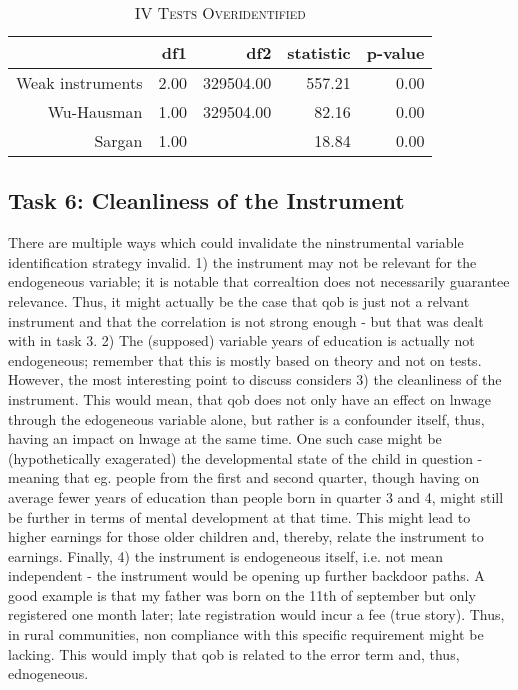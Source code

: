 \documentclass[a4paper]{article}
\begin{document}
\begin{table}[ht]
\captionsetup{font=small, justification=centering,singlelinecheck=false}
\caption{\textsc{IV Tests Overidentified}}
\centering
\begin{tabular}{rrrrr}
  \hline
 & df1 & df2 & statistic & p-value \\ 
  \hline
Weak instruments & 2.00 & 329504.00 & 557.21 & 0.00 \\ 
  Wu-Hausman & 1.00 & 329504.00 & 82.16 & 0.00 \\ 
  Sargan & 1.00 &  & 18.84 & 0.00 \\ 
   \hline
\end{tabular}
\end{table}

\subsection{Task 6: Cleanliness of the Instrument}
There are multiple ways which could invalidate the ninstrumental variable identification strategy invalid. 1) the instrument may not be relevant for the endogeneous variable; it is notable that correaltion does not necessarily guarantee relevance. Thus, it might actually be the case that qob is just not a relvant instrument and that the correlation is not strong enough - but that was dealt with in task 3. 2) The (supposed) variable years of education is actually not endogeneous; remember that this is mostly based on theory and not on tests. 
However, the most interesting point to discuss considers 3) the cleanliness of the instrument. This would mean, that qob does not only have an effect on lnwage through the edogeneous variable alone, but rather is a confounder itself, thus, having an impact on lnwage at the same time. One such case might be (hypothetically exagerated) the developmental state of the child in question - meaning that eg. people from the first and second quarter, though having on average fewer years of education than people born in quarter 3 and 4, might still be further in terms of mental development at that time. This might lead to higher earnings for those older children and, thereby, relate the instrument to earnings. 
Finally, 4) the instrument is endogeneous itself, i.e. not mean independent - the instrument would be opening up further backdoor paths. A good example is that my father was born on the 11th of september but only registered one month later; late registration would incur a fee (true story). Thus, in rural communities, non compliance with this specific requirement might be lacking. This would imply that qob is related to the error term and, thus, ednogeneous. 
\end{document}
